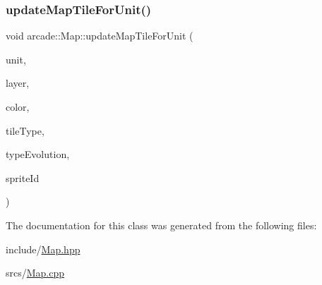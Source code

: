 \mbox{\label{classarcade_1_1_map_aafef74905482be652a9dc94f4b0c962e}} 
\subsubsection{\texorpdfstring{update\+Map\+Tile\+For\+Unit()}{updateMapTileForUnit()}}
{\footnotesize\ttfamily void arcade\+::\+Map\+::update\+Map\+Tile\+For\+Unit (\begin{DoxyParamCaption}\item[{\hyperlink{classarcade_1_1_unit}{arcade\+::\+Unit} const \&}]{unit,  }\item[{size\+\_\+t}]{layer,  }\item[{\hyperlink{unionarcade_1_1_color}{Color}}]{color,  }\item[{\hyperlink{namespacearcade_a61ba576694ea309cdf2b4b66902408ca}{Tile\+Type}}]{tile\+Type,  }\item[{\hyperlink{namespacearcade_a2e0a64a64203f78c9efb84a1475a8cf4}{Tile\+Type\+Evolution}}]{type\+Evolution,  }\item[{int}]{sprite\+Id }\end{DoxyParamCaption})}



The documentation for this class was generated from the following files\+:\begin{DoxyCompactItemize}
\item 
include/\hyperlink{_map_8hpp}{Map.\+hpp}\item 
srcs/\hyperlink{_map_8cpp}{Map.\+cpp}\end{DoxyCompactItemize}
